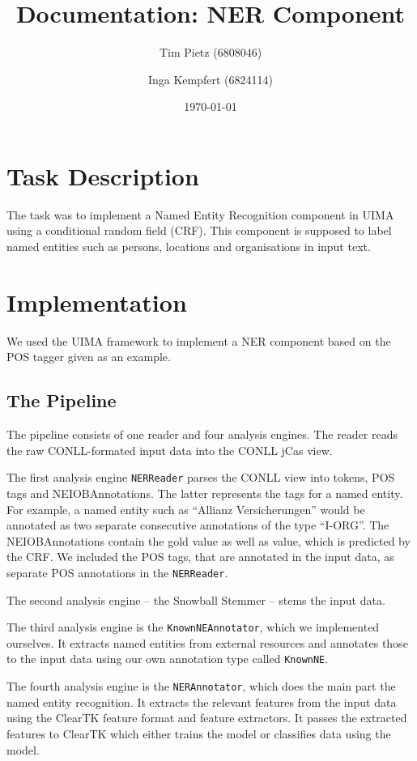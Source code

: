 \documentclass{article}
\title{Documentation: NER Component}
\author{Tim Pietz (6808046)\and Inga Kempfert (6824114)}
\date{\today}
\begin{document}
\maketitle

\section{Task Description}
The task was to implement a Named Entity Recognition component in UIMA using a conditional random field (CRF).
This component is supposed to label named entities such as persons, locations and organisations in input text.

\section{Implementation}
We used the UIMA framework to implement a NER component based on the POS tagger given as an example.

\subsection{The Pipeline}
The pipeline consists of one reader and four analysis engines.
The reader reads the raw CONLL-formated input data into the CONLL jCas view.

The first analysis engine \texttt{NERReader} parses the CONLL view into tokens, POS tags and NEIOBAnnotations.
The latter represents the tags for a named entity.
For example, a named entity such as \enquote{Allianz Versicherungen} would be annotated as two separate consecutive annotations of the type \enquote{I-ORG}.
The NEIOBAnnotations contain the gold value as well as value, which is predicted by the CRF.
We included the POS tags, that are annotated in the input data, as separate POS annotations in the \texttt{NERReader}.

The second analysis engine -- the Snowball Stemmer -- stems the input data.

The third analysis engine is the \texttt{KnownNEAnnotator}, which we implemented ourselves.
It extracts named entities from external resources and annotates those to the input data using our own annotation type called \texttt{KnownNE}.

The fourth analysis engine is the \texttt{NERAnnotator}, which does the main part the named entity recognition.
It extracts the relevant features from the input data using the ClearTK feature format and feature extractors.
It passes the extracted features to ClearTK which either trains the model or classifies data using the model.
\end{document}
